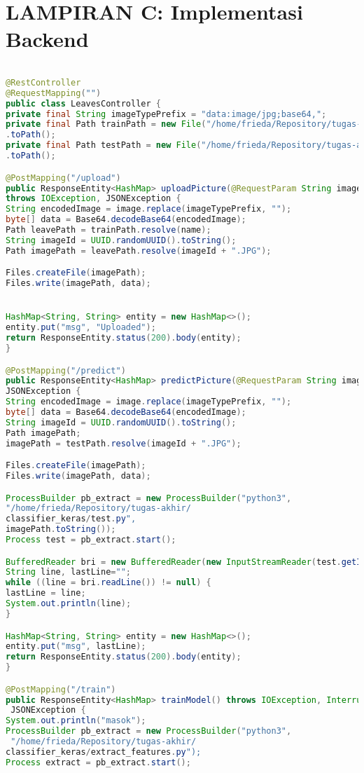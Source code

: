\chapter{LAMPIRAN C: Implementasi Backend}
\begin{lstlisting}[language=Java, caption=Implementasi Backend, label=code:api, firstnumber=0]

@RestController
@RequestMapping("")
public class LeavesController {
private final String imageTypePrefix = "data:image/jpg;base64,";
private final Path trainPath = new File("/home/frieda/Repository/tugas-akhir/RGB")
.toPath();
private final Path testPath = new File("/home/frieda/Repository/tugas-akhir/test")
.toPath();

@PostMapping("/upload")
public ResponseEntity<HashMap> uploadPicture(@RequestParam String image, @RequestParam String name) 
throws IOException, JSONException {
String encodedImage = image.replace(imageTypePrefix, "");
byte[] data = Base64.decodeBase64(encodedImage);
Path leavePath = trainPath.resolve(name);
String imageId = UUID.randomUUID().toString();
Path imagePath = leavePath.resolve(imageId + ".JPG");

Files.createFile(imagePath);
Files.write(imagePath, data);


HashMap<String, String> entity = new HashMap<>();
entity.put("msg", "Uploaded");
return ResponseEntity.status(200).body(entity);
}

@PostMapping("/predict")
public ResponseEntity<HashMap> predictPicture(@RequestParam String image) throws IOException, 
JSONException {
String encodedImage = image.replace(imageTypePrefix, "");
byte[] data = Base64.decodeBase64(encodedImage);
String imageId = UUID.randomUUID().toString();
Path imagePath;
imagePath = testPath.resolve(imageId + ".JPG");

Files.createFile(imagePath);
Files.write(imagePath, data);

ProcessBuilder pb_extract = new ProcessBuilder("python3",
"/home/frieda/Repository/tugas-akhir/
classifier_keras/test.py",
imagePath.toString());
Process test = pb_extract.start();

BufferedReader bri = new BufferedReader(new InputStreamReader(test.getInputStream()));
String line, lastLine="";
while ((line = bri.readLine()) != null) {
lastLine = line;
System.out.println(line);
}

HashMap<String, String> entity = new HashMap<>();
entity.put("msg", lastLine);
return ResponseEntity.status(200).body(entity);
}

@PostMapping("/train")
public ResponseEntity<HashMap> trainModel() throws IOException, InterruptedException,
 JSONException {
System.out.println("masok");
ProcessBuilder pb_extract = new ProcessBuilder("python3",
 "/home/frieda/Repository/tugas-akhir/
classifier_keras/extract_features.py");
Process extract = pb_extract.start();


\end{lstlisting}
